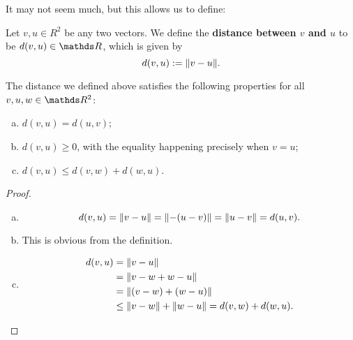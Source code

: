 It may not seem much, but this allows us to define:

\begin{df}
	Let $v,u\in R^2$ be any two vectors. We define the \textbf{distance between $v$ and $u$} to be $d(v,u)\in \R$, which is given by
	\[d(v,u):=\lVert v-u\rVert.\]
\end{df}

\begin{prop}
	The distance we defined above satisfies the following properties for all $v,u,w\in \R^2$:
	\begin{enumerate}[a)]
		\item $d(v,u)=d(u,v)$;
		\item $d(v,u)\geq0$, with the equality happening precisely when $v=u$;
		\item $d(v,u)\leq d(v,w)+d(w,u)$.		
	\end{enumerate}
\end{prop}
\begin{proof}
	\begin{enumerate}[a)]
		\item \[d(v,u)=\lVert v-u\rVert=\lVert-(u-v)\rVert=\lVert u-v\rVert=d(u,v).\]
		
		\item This is obvious from the definition.
		
		\item \begin{align*}
			d(v,u)&=\lVert v-u\rVert\\
			&=\lVert v-w+w-u\rVert\\
			&=\lVert(v-w)+(w-u)\rVert\\
			&\leq \lVert v-w\rVert+\lVert w-u\rVert=d(v,w)+d(w,u).
		\end{align*}
	\end{enumerate}
\end{proof}

